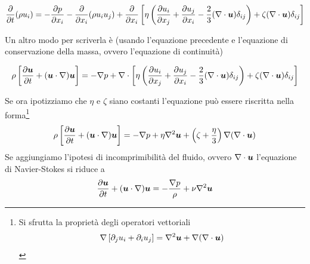 \begin{EQ}
\begin{equation}
\derP{}{t}(\rho u_i) = -\derP{p}{x_i} - \derP{}{x_i}(\rho u_i u_j)+ \derP{}{x_i}\left[ \eta \left( \derP{u_i}{x_j} + \derP{u_j}{x_i} - \dfrac{2}{3}(\Div{u}) \delta_{ij} \right) + \zeta(\Div{u}) \delta_{ij} \right]
\end{equation}
\end{EQ}
Un altro modo per scriverla è (usando l'equazione precedente e l'equazione di conservazione della massa, ovvero l'equazione di continuità)
\begin{EQ}
\begin{equation}
\rho \left[ \derP{\V{u}}{t} + (\scal{u}{\nabla})\V{u} \right] = -\Grad p + \V{\nabla}\cdot\left[ \eta \left( \derP{u_i}{x_j} + \derP{u_j}{x_i} - \dfrac{2}{3}(\Div{u}) \delta_{ij} \right) + \zeta(\Div{u}) \delta_{ij} \right]
\end{equation}
\end{EQ}
Se ora ipotizziamo che $\eta$ e $\zeta$ siano costanti l'equazione può essere riscritta nella forma\footnote{Si sfrutta la proprietà degli operatori vettoriali
\begin{align*}
\Grad\left[ \dpj u_i + \dpi u_j \right] = \Grad^2\V{u} + \Grad(\Div{u})
\end{align*}}
\begin{equation}
\rho \left[ \derP{\V{u}}{t} + (\scal{u}{\nabla})\V{u} \right] =  -\Grad p + \eta\nabla^2 \V{u} + \left( \zeta + \dfrac{\eta}{3} \right) \Grad(\Div{u})
\end{equation}
Se aggiungiamo l'ipotesi di incomprimibilità del fluido, ovvero $\Div{u}$ l'equazione di Navier-Stokes si riduce a 
\begin{equation}
\derP{\V{u}}{t} + (\scal{u}{\nabla})\V{u} =  -\dfrac{\Grad p}{\rho} + \nu\nabla^2 \V{u} 
\end{equation}


